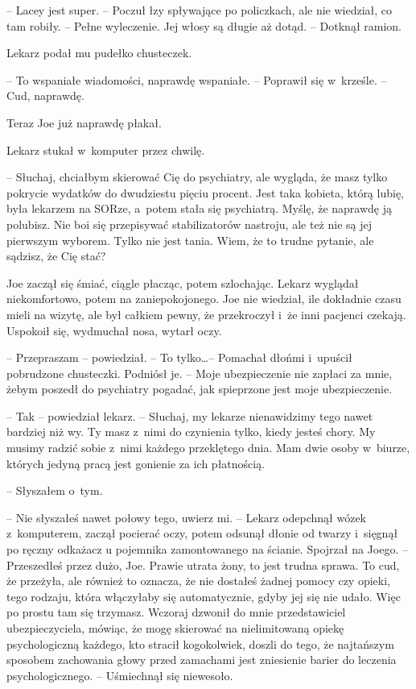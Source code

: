 \documentclass[oneside,polish,11pt,sfheadings]{mwbk}
\begin{document}
-- Lacey jest super. -- Poczuł łzy spływające po policzkach, ale nie
wiedział, co tam robiły. -- Pełne wyleczenie. Jej włosy są długie aż
dotąd. -- Dotknął ramion.

Lekarz podał mu pudełko chusteczek. 

-- To wspaniałe wiadomości, naprawdę
wspaniałe. -- Poprawił się w~krześle. -- Cud, naprawdę.

Teraz Joe już naprawdę płakał.

Lekarz stukał w~komputer przez chwilę. 

-- Słuchaj, chciałbym skierować
Cię do psychiatry, ale wygląda, że masz tylko pokrycie wydatków do
dwudziestu pięciu procent. Jest taka kobieta, którą lubię, była lekarzem
na SORze, a~potem stała się psychiatrą. Myślę, że naprawdę ją polubisz.
Nie boi się przepisywać stabilizatorów nastroju, ale też nie są jej
pierwszym wyborem. Tylko nie jest tania. Wiem, że to trudne pytanie, ale
sądzisz, że Cię stać?

Joe zaczął się śmiać, ciągle płacząc, potem szlochając. Lekarz wyglądał
niekomfortowo, potem na zaniepokojonego. Joe nie wiedział, ile dokładnie
czasu mieli na wizytę, ale był całkiem pewny, że przekroczył i~że inni
pacjenci czekają. Uspokoił się, wydmuchał nosa, wytarł oczy.

-- Przepraszam -- powiedział. -- To tylko\ldots  -- Pomachał dłońmi i~upuścił
pobrudzone chusteczki. Podniósł je. -- Moje ubezpieczenie nie zapłaci za
mnie, żebym poszedł do psychiatry pogadać, jak spieprzone jest moje
ubezpieczenie.

-- Tak -- powiedział lekarz. -- Słuchaj, my lekarze nienawidzimy tego nawet
bardziej niż wy. Ty masz z~nimi do czynienia tylko, kiedy jesteś chory.
My musimy radzić sobie z~nimi każdego przeklętego dnia. Mam dwie osoby w~biurze, których jedyną pracą jest gonienie za ich płatnością.

-- Słyszałem o~tym.

-- Nie słyszałeś nawet połowy tego, uwierz mi. -- Lekarz odepchnął wózek z~komputerem, zaczął pocierać oczy, potem odsunął dłonie od twarzy i~sięgnął po ręczny odkażacz u pojemnika zamontowanego na ścianie.
Spojrzał na Joego. -- Przeszedłeś przez dużo, Joe. Prawie utrata żony, to
jest trudna sprawa. To cud, że przeżyła, ale również to oznacza, że nie
dostałeś żadnej pomocy czy opieki, tego rodzaju, która włączyłaby się
automatycznie, gdyby jej się nie udało. Więc po prostu tam się trzymasz.
Wczoraj dzwonił do mnie przedstawiciel ubezpieczyciela, mówiąc, że mogę
skierować na nielimitowaną opiekę psychologiczną każdego, kto stracił
kogokolwiek, doszli do tego, że najtańszym sposobem zachowania głowy
przed zamachami jest zniesienie barier do leczenia psychologicznego. -- Uśmiechnął się niewesoło.
\end{document}
